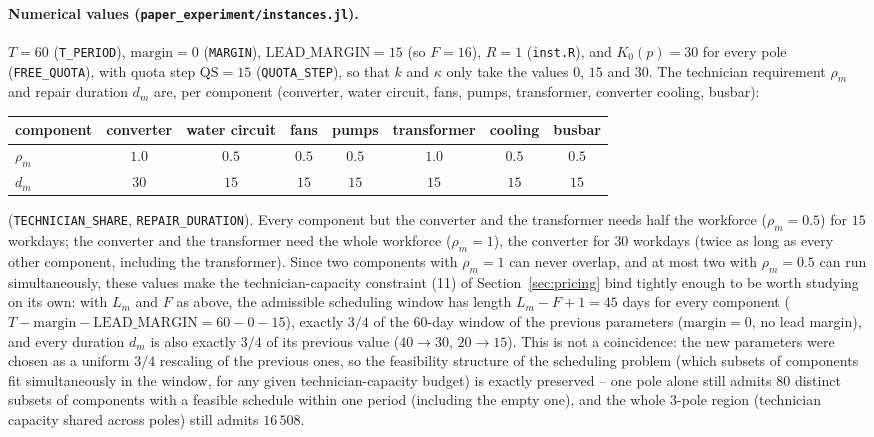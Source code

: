 \documentclass[11pt]{article}
\begin{document}
\paragraph{Numerical values (\texttt{paper\_experiment/instances.jl}).} $T = 60$
(\texttt{T\_PERIOD}), $\mathrm{margin} = 0$ (\texttt{MARGIN}),
$\mathrm{LEAD\_MARGIN} = 15$ (so $F = 16$), $R = 1$
(\texttt{inst.R}), and $K_0(p) = 30$ for every pole (\texttt{FREE\_QUOTA}), with quota
step $\mathrm{QS} = 15$ (\texttt{QUOTA\_STEP}), so that $k$ and $\kappa$ only take the
values $0$, $15$ and $30$. The
technician requirement $\rho_m$ and repair duration $d_m$ are, per component (converter,
water circuit, fans, pumps, transformer, converter cooling, busbar):
\begin{center}
\begin{tabular}{lccccccc}
\toprule
component & converter & water circuit & fans & pumps & transformer & cooling & busbar \\
\midrule
$\rho_m$ & $1.0$ & $0.5$ & $0.5$ & $0.5$ & $1.0$ & $0.5$ & $0.5$ \\
$d_m$    & $30$  & $15$  & $15$  & $15$  & $15$  & $15$  & $15$  \\
\bottomrule
\end{tabular}
\end{center}
(\texttt{TECHNICIAN\_SHARE}, \texttt{REPAIR\_DURATION}). Every component but the converter
and the transformer needs half the workforce ($\rho_m=0.5$) for $15$ workdays; the converter
and the transformer need the whole workforce ($\rho_m=1$), the converter for $30$ workdays
(twice as long as every other component, including the transformer). Since two components
with $\rho_m=1$ can never overlap, and at most two with $\rho_m=0.5$ can run simultaneously,
these values make the technician-capacity constraint (11) of Section~\ref{sec:pricing} bind
tightly enough to be worth studying on its own: with $L_m$ and $F$ as above, the admissible
scheduling window has length $L_m - F + 1 = 45$ days for every component ($T - \mathrm{margin}
- \mathrm{LEAD\_MARGIN} = 60 - 0 - 15$), exactly $3/4$ of the $60$-day window of the
previous parameters ($\mathrm{margin}=0$, no lead margin), and every duration $d_m$ is also
exactly $3/4$ of its previous value ($40 \to 30$, $20 \to 15$). This is not a coincidence:
the new parameters were chosen as a uniform $3/4$ rescaling of the previous ones, so the
feasibility structure of the scheduling problem (which subsets of components fit
simultaneously in the window, for any given technician-capacity budget) is exactly
preserved -- one pole alone still admits $80$ distinct subsets of components with a
feasible schedule within one period (including the empty one), and the whole $3$-pole
region (technician capacity shared across poles) still admits $16\,508$.
\end{document}
